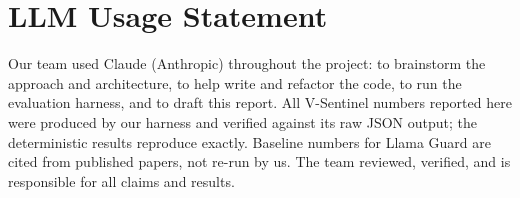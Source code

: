 \documentclass[11pt, a4paper]{article}
\begin{document}
\section*{LLM Usage Statement}
Our team used Claude (Anthropic) throughout the project: to brainstorm the approach and architecture, to help write and refactor the code, to run the evaluation harness, and to draft this report. All V-Sentinel numbers reported here were produced by our harness and verified against its raw JSON output; the deterministic results reproduce exactly. Baseline numbers for Llama Guard are cited from published papers, not re-run by us. The team reviewed, verified, and is responsible for all claims and results.
\end{document}
